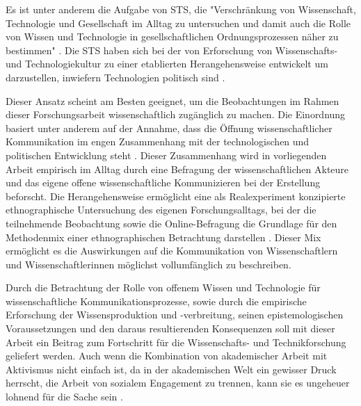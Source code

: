 Es ist unter anderem die Aufgabe von STS, die "Verschränkung von Wissenschaft, Technologie und Gesellschaft im Alltag zu untersuchen und damit auch die Rolle von Wissen und Technologie in gesellschaftlichen Ordnungsprozessen näher zu bestimmen" \cite{beck_2014_science}. Die STS haben sich bei der von Erforschung von Wissenschafts- und Technologiekultur zu einer etablierten Herangehensweise entwickelt um darzustellen, inwiefern Technologien politisch sind \cite{kelty_2014_freedom}.

Dieser Ansatz scheint am Besten geeignet, um die Beobachtungen im Rahmen dieser Forschungsarbeit wissenschaftlich zugänglich zu machen. Die Einordnung basiert unter anderem auf der Annahme, dass die Öffnung wissenschaftlicher Kommunikation im engen Zusammenhang mit der technologischen und politischen Entwicklung steht \cite{weingart_2005_wissenschaft}. Dieser Zusammenhang wird in vorliegenden Arbeit empirisch im Alltag durch eine Befragung der wissenschaftlichen Akteure und das eigene offene wissenschaftliche Kommunizieren bei der Erstellung beforscht. Die Herangehensweise ermöglicht eine als Realexperiment konzipierte ethnographische Untersuchung des eigenen Forschungsalltags, bei der die teilnehmende Beobachtung sowie die Online-Befragung die Grundlage für den Methodenmix einer ethnographischen Betrachtung darstellen \cite{bachmann_2011_ethnographie}. Dieser Mix ermöglicht es die Auswirkungen auf die Kommunikation von Wissenschaftlern und Wissenschaftlerinnen möglichst vollumfänglich zu beschreiben.

Durch die Betrachtung der Rolle von offenem Wissen und Technologie für wissenschaftliche Kommunikationsprozesse, sowie durch die empirische Erforschung der Wissensproduktion und -verbreitung, seinen epistemologischen Voraussetzungen und den daraus resultierenden Konsequenzen \cite{beck_2014_science} soll mit dieser Arbeit ein Beitrag zum Fortschritt für die Wissenschafts- und Technikforschung geliefert werden. Auch wenn die Kombination von akademischer Arbeit mit Aktivismus nicht einfach ist, da in der akademischen Welt ein gewisser Druck herrscht, die Arbeit von sozialem Engagement zu trennen, kann sie es ungeheuer lohnend für die Sache sein \cite[:25]{flood_2013_combining}.
